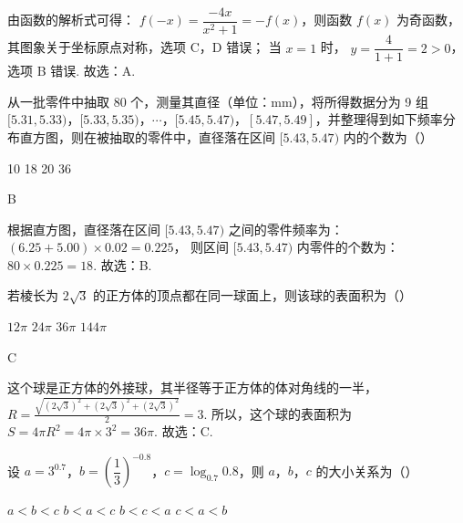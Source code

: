\begin{solution}
由函数的解析式可得： \( f(-x)=\dfrac{-4x}{x^2+1}=-f(x) \)，则函数 \( f(x) \) 为奇函数，其图象关于坐标原点对称，选项 C，D 错误；
当 \( x=1 \) 时， \( y=\dfrac{4}{1+1}=2>0 \)，选项 B 错误.
故选：A.
\end{solution}

\begin{problem}
从一批零件中抽取 80 个，测量其直径（单位：mm），将所得数据分为 9 组 \([5.31,5.33)\)，\([5.33,5.35)\)，\(\cdots\)，\([5.45,5.47)\)，\([5.47,5.49]\)，并整理得到如下频率分布直方图，则在被抽取的零件中，直径落在区间 \([5.43,5.47)\) 内的个数为（\quad）

\begin{center}
\end{center}

\choices
    {10}
    {18}
    {20}
    {36}
\end{problem}

\begin{answer}
B
\end{answer}

\begin{solution}
根据直方图，直径落在区间 \([5.43,5.47)\) 之间的零件频率为： \( \left( 6.25+5.00 \right)\times0.02=0.225 \)，
则区间 \([5.43,5.47)\) 内零件的个数为： \( 80\times0.225=18 \).
故选：B.
\end{solution}

\begin{problem}
若棱长为 \(2\sqrt3\) 的正方体的顶点都在同一球面上，则该球的表面积为（\quad）

\choices
    {\(12\pi\)}
    {\(24\pi\)}
    {\(36\pi\)}
    {\(144\pi\)}
\end{problem}

\begin{answer}
C
\end{answer}

\begin{solution}
这个球是正方体的外接球，其半径等于正方体的体对角线的一半，
\(R=\frac{\sqrt{\left( 2\sqrt3 \right)^2+\left( 2\sqrt3 \right)^2+\left( 2\sqrt3 \right)^2}}{2}=3\).
所以，这个球的表面积为 \( S=4\pi R^2=4\pi\times3^2=36\pi \).
故选：C.
\end{solution}

\begin{problem}
设 \(a=3^{0.7}\)，\(b=\left( \dfrac13 \right)^{-0.8}\)，\(c=\log_{0.7}0.8\)，则 \(a\)，\(b\)，\(c\) 的大小关系为（\quad）

\choices
    {\(a<b<c\)}
    {\(b<a<c\)}
    {\(b<c<a\)}
    {\(c<a<b\)}
\end{problem}

